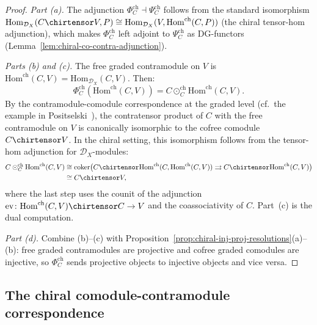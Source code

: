 \begin{proof}
\emph{Part (a).}
The adjunction $\Phi_C^{\mathrm{ch}} \dashv \Psi_C^{\mathrm{ch}}$
follows from the standard isomorphism
$\mathrm{Hom}_{\mathcal{D}_X}(C \chirtensor V, P)
\cong \mathrm{Hom}_{\mathcal{D}_X}(V, \mathrm{Hom}^{\mathrm{ch}}(C, P))$
(the chiral tensor-hom adjunction), which makes
$\Phi_C^{\mathrm{ch}}$ left adjoint to $\Psi_C^{\mathrm{ch}}$ as
DG-functors (Lemma~\ref{lem:chiral-co-contra-adjunction}).

\emph{Parts (b) and (c).}
The free graded contramodule on $V$ is
$\mathrm{Hom}^{\mathrm{ch}}(C, V) = \mathrm{Hom}_{\mathcal{D}_X}(C, V)$.
Then:
\[
\Phi_C^{\mathrm{ch}}(\mathrm{Hom}^{\mathrm{ch}}(C, V))
= C \odot_C^{\mathrm{ch}} \mathrm{Hom}^{\mathrm{ch}}(C, V).
\]
By the contramodule-comodule correspondence at the graded level
(cf.\ the example in
Positselski~\cite[\S5.1]{Positselski11}), the
contratensor product of $C$ with the free contramodule on $V$ is
canonically isomorphic to the cofree comodule $C \chirtensor V$.
In the chiral setting, this isomorphism follows from the
tensor-hom adjunction for $\mathcal{D}_X$-modules:
\begin{align*}
C \odot_C^{\mathrm{ch}} \mathrm{Hom}^{\mathrm{ch}}(C, V)
&\cong \mathrm{coker}\bigl(
C \chirtensor \mathrm{Hom}^{\mathrm{ch}}(C, \mathrm{Hom}^{\mathrm{ch}}(C, V))
\rightrightarrows C \chirtensor \mathrm{Hom}^{\mathrm{ch}}(C, V)
\bigr) \\
&\cong C \chirtensor V,
\end{align*}
where the last step uses the counit of the adjunction
$\mathrm{ev}\colon \mathrm{Hom}^{\mathrm{ch}}(C, V) \chirtensor C
\to V$ and the coassociativity of $C$. Part~(c) is the dual computation.

\emph{Part (d).}
Combine (b)--(c) with
Proposition~\ref{prop:chiral-inj-proj-resolutions}(a)--(b):
free graded contramodules are projective and cofree graded comodules
are injective, so $\Phi_C^{\mathrm{ch}}$ sends projective objects
to injective objects and vice versa.
\end{proof}

\subsection{The chiral comodule-contramodule correspondence}
\label{subsec:chiral-co-contra-correspondence}

